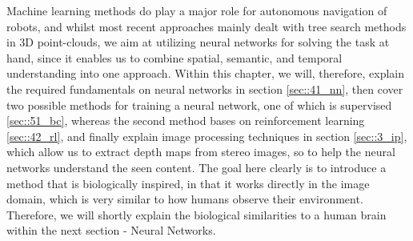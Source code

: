 \FloatBarrier
Machine learning methods do play a major role for autonomous navigation of robots, and whilst most recent approaches mainly dealt with tree search methods in 3D point-clouds, we aim at utilizing neural networks for solving the task at hand, since it enables us to combine spatial, semantic, and temporal understanding into one approach. Within this chapter, we will, therefore, explain the required fundamentals on neural networks in section \ref{sec::41_nn}, then cover two possible methods for training a neural network, one of which is supervised \ref{sec::51_bc}, whereas the second method bases on reinforcement learning \ref{sec::42_rl}, and finally explain image processing techniques in section \ref{sec::3_ip}, which allow us to extract depth maps from stereo images, so to help the neural networks understand the seen content. The goal here clearly is to introduce a method that is biologically inspired, in that it works directly in the image domain, which is very similar to how humans observe their environment. Therefore, we will shortly explain the biological similarities to a human brain within the next section - Neural Networks.